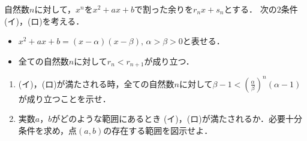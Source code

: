 自然数$n$に対して，$x^n$を$x^2+ax+b$で割った余りを$r_nx+s_n$とする．
次の$2$条件(イ)，(ロ)を考える．
\begin{itemize}
  \item[(イ)] $x^2+ax+b=(x-\alpha)(x-\beta),\, \alpha>\beta>0$と表せる．
  \item[(ロ)] 全ての自然数$n$に対して$r_n<r_{n+1}$が成り立つ．
\end{itemize}
\begin{enumerate}
  \item (イ)，(ロ)が満たされる時，全ての自然数$n$に対して${\displaystyle \beta-1<\left(\frac{\alpha}{\beta}\right)^n(\alpha-1)}$が成り立つことを示せ．
  \item 実数$a$，$b$がどのような範囲にあるとき (イ)，(ロ)が満たされるか．必要十分条件を求め，点$(a,b)$の存在する範囲を図示せよ．
\end{enumerate}